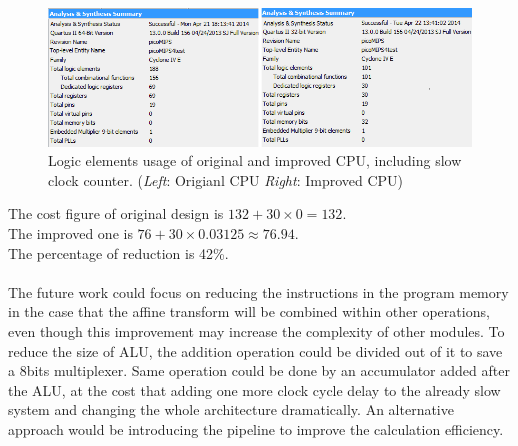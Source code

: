 \begin{figure}[H]
		\centering
		\includegraphics[width = \textwidth]{Figures/cpucost}		
		\caption{Logic elements usage of original and improved CPU, including slow clock counter. (\textit{Left}: Origianl CPU \textit{Right}: Improved CPU)}
		\label {fig:cpucost}
\end{figure}
The cost figure of original design is \(132 + 30 \times 0 = 132 \). \\
The improved one is \(76 + 30 \times 0.03125 \approx 76.94 \).  \\
The percentage of reduction is 42\%.\\\\
The future work could focus on reducing the instructions in the program memory in the case that the affine transform will be combined within other operations, even though this improvement may increase the complexity of other modules. To reduce the size of ALU, the addition operation could be divided out of it to save a 8bits multiplexer. Same operation could be done by an accumulator added after the ALU, at the cost that adding one more clock cycle delay to the already slow system and changing the whole architecture dramatically. An alternative approach would be introducing the pipeline to improve the calculation efficiency.

